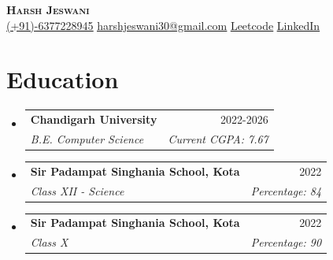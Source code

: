 \documentclass[letterpaper,101.9cm]{article}
\makeatletter
\newcommand{\resumeSubHeadingListStart}{\begin{itemize}[leftmargin=0.15in, label={}]}
\newcommand{\resumeSubHeadingListEnd}{\end{itemize}\vspace{-3pt}}
\newcommand{\resumeSubheading}[4]{
  \vspace{-2pt}\item
    \begin{tabular*}{0.97\textwidth}[t]{l@{\extracolsep{\fill}}r}
      \textbf{#1} & #2 \\
      \textit{\small#3} & \textit{\small #4} \\
    \end{tabular*}\vspace{-7pt}
}
\newcommand{\resumeSubHeadingListStart}{\begin{itemize}[leftmargin=0.15in, label={}]}
\newcommand{\resumeSubHeadingListEnd}{\end{itemize}}
\makeatother
\begin{document}
\vspace*{0.1cm}
\begin{center}
    \textbf{\Huge \scshape Harsh Jeswani} \\ \vspace{2pt}
    \small 
     \href{tel:(+91)6394335020}{\underline{(+91)-6377228945}} \hspace{0.3cm} %
     \href{mailto:harshjeswani30@gmail.com}{\underline{harshjeswani30@gmail.com}} \hspace{0.3cm} %
     \href{https://leetcode.com/u/Harshjeswani30/}{\underline{Leetcode}} \hspace{0.3cm} %
     \href{https://www.linkedin.com/in/harshjeswani30/}{\underline{LinkedIn}}
\end{center}




\section{Education}
  \resumeSubHeadingListStart
  
    \resumeSubheading
      {Chandigarh University}{2022-2026}
      {B.E. Computer Science}{Current CGPA: 7.67}
\vspace{+1pt}
      \resumeSubheading
      {Sir Padampat Singhania School, Kota}{2022}
      {Class XII - Science}{Percentage: 84}
      \vspace{+1pt}

      \resumeSubheading
      {Sir Padampat Singhania School, Kota}{2022}
      {Class X}{Percentage: 90}
      
  

    \vspace{+3pt}

  \resumeSubHeadingListEnd


\end{document}
